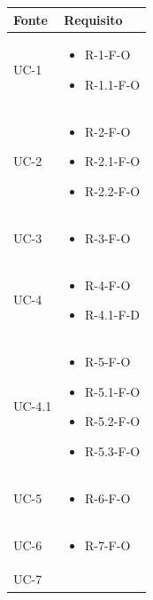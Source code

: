 \renewcommand{\arraystretch}{1.5}
\begin{center}
    \begin{longtable}{| C{6cm} |C{6cm}|} \hline
        \textbf{Fonte} & \textbf{Requisito} \\\hline
        UC-1 &
        \begin{itemize}
            \item R-1-F-O
            \item R-1.1-F-O
        \end{itemize}
        \\\hline
        UC-2 &
        \begin{itemize}
            \item R-2-F-O
            \item R-2.1-F-O
            \item R-2.2-F-O
        \end{itemize}
        \\\hline
        UC-3 &
        \begin{itemize}
            \item R-3-F-O
        \end{itemize}\\\hline
        UC-4 &
        \begin{itemize}
            \item R-4-F-O
            \item R-4.1-F-D
        \end{itemize}\\\hline
        UC-4.1 &
        \begin{itemize}
            \item R-5-F-O
            \item R-5.1-F-O
            \item R-5.2-F-O
            \item R-5.3-F-O
        \end{itemize}\\\hline
        UC-5 &
        \begin{itemize}
            \item R-6-F-O
        \end{itemize}\\\hline
        UC-6 &
        \begin{itemize}
            \item R-7-F-O
        \end{itemize}\\\hline
        UC-7 &
        \begin{itemize}

\end{itemize}
\end{longtable}
\end{center}
